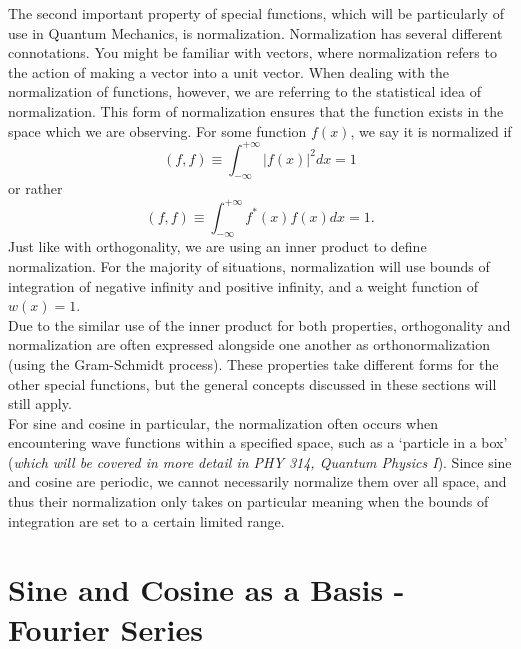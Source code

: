 \documentclass[11pt]{report}
\begin{document}
The second important property of special functions, which will be particularly of use in Quantum Mechanics, is normalization. Normalization has several different connotations. You might be familiar with vectors, where normalization refers to the action of making a vector into a unit vector. When dealing with the normalization of functions, however, we are referring to the statistical idea of normalization. This form of normalization ensures that the function exists in the space which we are observing. For some function $f(x)$, we say it is normalized if
    \begin{equation}
        \left(f,f\right) \equiv \int_{-\infty}^{+\infty}|f(x)|^2dx = 1
    \end{equation}
or rather
    \begin{equation*}
        \left(f,f\right) \equiv \int_{-\infty}^{+\infty}f^*(x)f(x)dx = 1.
    \end{equation*}
Just like with orthogonality, we are using an inner product to define normalization. For the majority of situations, normalization will use bounds of integration of negative infinity and positive infinity, and a weight function of $w(x)=1$.\\ 


Due to the similar use of the inner product for both properties, orthogonality and normalization are often expressed alongside one another as orthonormalization (using the Gram-Schmidt process). These properties take different forms for the other special functions, but the general concepts discussed in these sections will still apply.\\

For sine and cosine in particular, the normalization often occurs when encountering wave functions within a specified space, such as a `particle in a box' (\emph{which will be covered in more detail in PHY 314, Quantum Physics I}). Since sine and cosine are periodic, we cannot necessarily normalize them over all space, and thus their normalization only takes on particular meaning when the bounds of integration are set to a certain limited range.




\section{Sine and Cosine as a Basis - Fourier Series}
\end{document}
